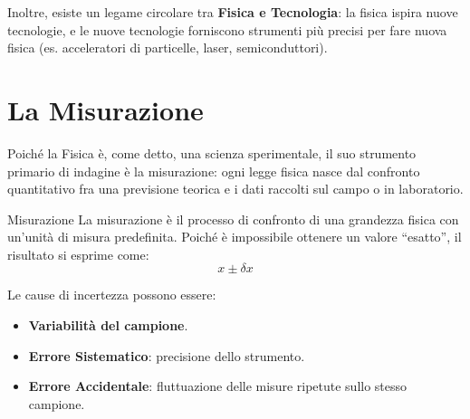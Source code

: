 Inoltre, esiste un legame circolare tra \textbf{Fisica e Tecnologia}: la fisica ispira nuove tecnologie, e le nuove tecnologie forniscono strumenti più precisi per fare nuova fisica (es. acceleratori di particelle, laser, semiconduttori).

\section{La Misurazione}
Poiché la Fisica è, come detto, una scienza sperimentale, il suo strumento primario di indagine è la misurazione: ogni legge fisica nasce dal confronto quantitativo fra una previsione teorica e i dati raccolti sul campo o in laboratorio.

\begin{definizione}{Misurazione}
La misurazione è il processo di confronto di una grandezza fisica con un'unità di misura predefinita. Poiché è impossibile ottenere un valore ``esatto'', il risultato si esprime come:
\begin{equation}
    x \pm \delta x
\end{equation}
\end{definizione}

Le cause di incertezza possono essere:
\begin{itemize}
    \item \textbf{Variabilità del campione}.
    \item \textbf{Errore Sistematico}: precisione dello strumento.
    \item \textbf{Errore Accidentale}: fluttuazione delle misure ripetute sullo stesso campione.
\end{itemize}

